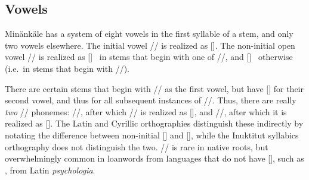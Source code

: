 \subsection{Vowels}\label{s:vowels}
Min\"ank\"ale
%
%
has a system of eight vowels in the first syllable of a stem, and only two
vowels elsewhere. The initial vowel // is realized as []. The
non-initial open vowel // is realized as []~ in stems
that begin with one of \mbox{//}, and []~ otherwise
(i.e.~in stems that begin with \mbox{//}).

There are certain stems that begin with // as the first vowel, but have
[] for their second vowel, and thus for all subsequent instances of
//. Thus, there are really \emph{two} // phonemes:
//, after which // is realized as [], and
//, after which it is realized as []. The Latin and
Cyrillic orthographies distinguish these indirectly by notating the difference
between non-initial [] and [], while the Inuktitut syllabics
orthography does not distinguish the two.\enlargethispage{1cm}
// is rare in native roots, but overwhelmingly common in
loanwords from languages that do not have [], such as
, from Latin \textit{psychologia}.
\pagebreak

